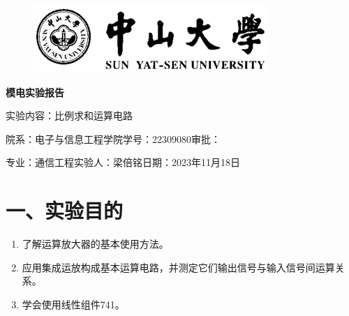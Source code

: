 \documentclass[a4paper,10pt,notitlepage]{article}
\begin{document}
	\large
	\onehalfspacing
	\begin{figure}[h]
		\raggedright
		\includegraphics{1.png}
	\end{figure}
	\centering
	{\Huge\textbf{模电实验报告}\par}
	\vspace{0.2cm}
	{\huge{实验内容：比例求和运算电路}\par}
	\raggedright
	\vspace{0.3cm}
	\begin{centering}
		{\large 院系：电子与信息工程学院\hfill 学号：22309080\hfill 审批：\hspace{2cm} \par
			专业：通信工程\hfill 实验人：梁倍铭\hfill 日期：2023年11月18日 \par}
	\end{centering}
	\vspace{0.3cm}
	\section*{一、实验目的}
	\begin{enumerate}
		\item 了解运算放大器的基本使用方法。
		\item 应用集成运放构成基本运算电路，并测定它们输出信号与输入信号间运算关系。
		\item 学会使用线性组件741。
	\end{enumerate}
\end{document}
